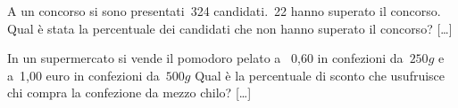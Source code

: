 \begin{multicols}{2}
\begin{esercizio}
\label{ese:3.189}
 A un concorso si sono presentati~324 candidati.~22 hanno superato il
concorso. Qual è stata la percentuale dei candidati che non hanno
superato il concorso? \hfill [\dots]
\end{esercizio}

% 

\begin{esercizio}
\label{ese:3.192}
In un supermercato si vende il pomodoro pelato a \officialeuro\ 0,60 in
confezioni da~\(250\unit{g}\) e a~1,00 euro in confezioni da~\(500\unit{g}\) 
Qual è la percentuale di sconto che usufruisce chi compra la confezione da 
mezzo chilo? \hfill [\dots]
\end{esercizio}


% 


\end{multicols}
